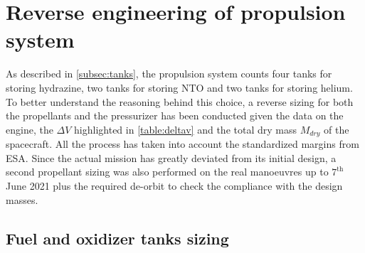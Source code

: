 \section{Reverse engineering of propulsion system}
\label{sec:reverse_prop}

As described in \autoref{subsec:tanks}, the propulsion system counts four tanks for storing hydrazine, two tanks for storing NTO and two tanks for storing helium.
To better understand the reasoning behind this choice, a reverse sizing for both the propellants and the pressurizer has been conducted given the data on the engine, the $\Delta V$ highlighted in \autoref{table:deltav} and the total dry mass $M_{dry}$ \cite{masses_ref} of the spacecraft.
All the process has taken into account the standardized margins from ESA. \cite{esa_margins}
Since the actual mission has greatly deviated from its initial design, a second propellant sizing was also performed on the real manoeuvres up to $7^{\textrm{th}}$ June 2021 \cite{juno_inner} \cite{otm} \cite{prm_redesign} plus the required de-orbit to check the compliance with the design masses.

\subsection{Fuel and oxidizer tanks sizing}
\label{subsec:fuel_ox_sizing}

